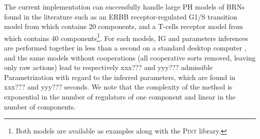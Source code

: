 The current implementation can successfully handle large PH models of BRNs found in the literature
such as an ERBB receptor-regulated G1/S transition model from \cite{Sahin09} which contains 20
components, and a T-cells receptor model from \cite{Klamt06} which contains 40
components\footnote{Both models are available as examples along with the \textsc{Pint} library.}.
For each models, IG and parameters inferences are performed together in less than a second on a
standard desktop computer%
, and the same models without cooperations
(all cooperative sorts removed, leaving only raw actions) lead to
respectively xxx??? and yyy??? admissible Parametrization with regard to the inferred parameters,
which are found in xxx??? and yyy??? seconds.
We note that the complexity of the method is exponential in the number of regulators of one
component and linear in the number of components.
